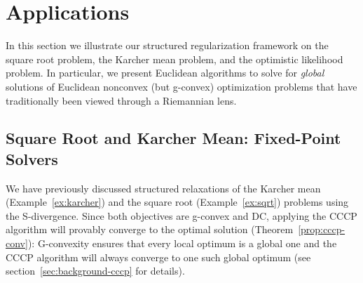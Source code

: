 \documentclass[sn-nature]{sn-jnl}%
\theoremstyle{thmstyleone}%
\theoremstyle{thmstyletwo}%
\theoremstyle{thmstylethree}%
\begin{document}
\section{Applications}
In this section we illustrate our structured regularization framework on the square root problem, the Karcher mean problem, and the optimistic likelihood problem. In particular, we present Euclidean algorithms to solve for \emph{global} solutions of Euclidean nonconvex (but g-convex) optimization problems that have traditionally been viewed through a Riemannian lens. 


\subsection{Square Root and Karcher Mean: Fixed-Point Solvers}
We have previously discussed structured relaxations of the Karcher mean (Example~\ref{ex:karcher}) and the square root (Example~\ref{ex:sqrt}) problems using the S-divergence. Since both objectives are g-convex and DC, applying the CCCP algorithm will provably converge to the optimal solution (Theorem~\ref{prop:cccp-conv}): G-convexity ensures that every local optimum is a global one and the CCCP algorithm will always converge to one such global optimum (see section~\ref{sec:background-cccp} for details).
\end{document}
